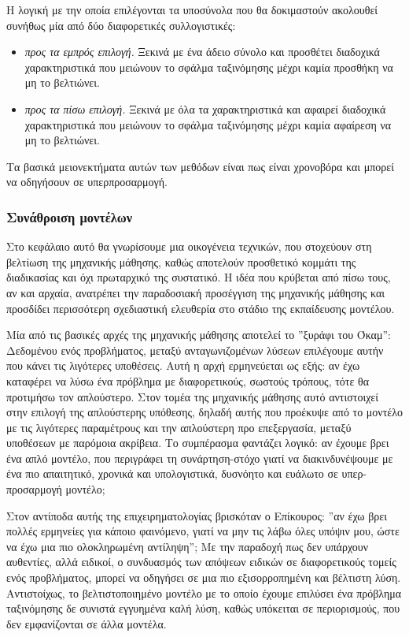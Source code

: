 Η λογική με την οποία επιλέγονται τα υποσύνολα που θα δοκιμαστούν ακολουθεί συνήθως μία από δύο διαφορετικές συλλογιστικές:
\begin{itemize}
	\item \textit{προς τα εμπρός επιλογή.} Ξεκινά με ένα άδειο σύνολο και προσθέτει διαδοχικά χαρακτηριστικά που μειώνουν το σφάλμα ταξινόμησης μέχρι καμία προσθήκη να μη το βελτιώνει.
	\item \textit{προς τα πίσω επιλογή.} Ξεκινά με όλα τα χαρακτηριστικά και αφαιρεί διαδοχικά χαρακτηριστικά που μειώνουν το σφάλμα ταξινόμησης μέχρι καμία αφαίρεση να μη το βελτιώνει.
\end{itemize}
Τα βασικά μειονεκτήματα αυτών των μεθόδων είναι πως είναι χρονοβόρα και μπορεί να οδηγήσουν σε υπερπροσαρμογή.

\subsubsection{Συνάθροιση μοντέλων}
Στο κεφάλαιο αυτό θα γνωρίσουμε μια οικογένεια τεχνικών, που στοχεύουν στη βελτίωση της μηχανικής μάθησης, καθώς αποτελούν προσθετικό κομμάτι της διαδικασίας και όχι πρωταρχικό της συστατικό. Η ιδέα που κρύβεται από πίσω τους, αν και αρχαία, ανατρέπει την παραδοσιακή προσέγγιση της μηχανικής μάθησης και προσδίδει περισσότερη σχεδιαστική ελευθερία στο στάδιο της εκπαίδευσης μοντέλου.

Μία από τις βασικές αρχές της μηχανικής μάθησης αποτελεί το ”ξυράφι του Όκαμ”: Δεδομένου ενός προβλήματος, μεταξύ ανταγωνιζομένων λύσεων επιλέγουμε αυτήν που κάνει τις λιγότερες υποθέσεις. Αυτή η αρχή ερμηνεύεται ως εξής: αν έχω καταφέρει να λύσω ένα πρόβλημα με διαφορετικούς, σωστούς τρόπους, τότε θα προτιμήσω τον απλούστερο. Στον τομέα της μηχανικής μάθησης αυτό αντιστοιχεί στην επιλογή της απλούστερης υπόθεσης, δηλαδή αυτής που προέκυψε από το μοντέλο με τις λιγότερες
παραμέτρους και την απλούστερη προ επεξεργασία, μεταξύ υποθέσεων με παρόμοια ακρίβεια. Το συμπέρασμα φαντάζει λογικό: αν έχουμε βρει ένα απλό μοντέλο, που περιγράφει τη συνάρτηση-στόχο γιατί να διακινδυνέψουμε με ένα πιο απαιτητικό, χρονικά και υπολογιστικά, δυσνόητο και ευάλωτο σε υπερ-προσαρμογή μοντέλο;

Στον αντίποδα αυτής της επιχειρηματολογίας βρισκόταν ο Επίκουρος: ”αν έχω βρει πολλές ερμηνείες για κάποιο φαινόμενο, γιατί να μην τις λάβω όλες υπόψιν μου, ώστε να έχω μια πιο ολοκληρωμένη αντίληψη”; Με την παραδοχή πως δεν υπάρχουν αυθεντίες, αλλά ειδικοί, ο συνδυασμός των απόψεων ειδικών σε διαφορετικούς τομείς ενός προβλήματος, μπορεί να οδηγήσει σε μια πιο εξισορροπημένη και βέλτιστη λύση. Αντιστοίχως, το βελτιστοποιημένο μοντέλο με το οποίο έχουμε επιλύσει ένα πρόβλημα ταξινόμησης δε συνιστά εγγυημένα καλή λύση, καθώς υπόκειται σε περιορισμούς, που δεν εμφανίζονται σε άλλα μοντέλα.

